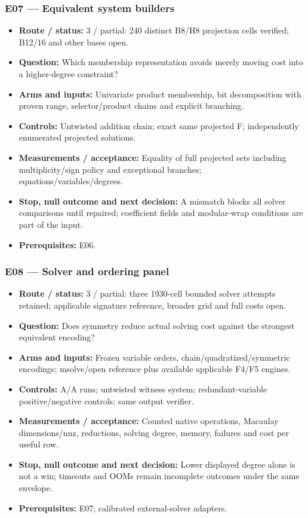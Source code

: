 \documentclass[
  10pt,
]{article}
\providecommand{\tightlist}{%
  \setlength{\itemsep}{0pt}\setlength{\parskip}{0pt}}
\begin{document}
\subsubsection{E07 --- Equivalent system
builders}\label{e07-equivalent-system-builders}

\begin{itemize}
\tightlist
\item
  \textbf{Route / status:} 3 / partial: 240 distinct B8/H8 projection
  cells verified; B12/16 and other bases open.
\item
  \textbf{Question:} Which membership representation avoids merely
  moving cost into a higher-degree constraint?
\item
  \textbf{Arms and inputs:} Univariate product membership, bit
  decomposition with proven range, selector/product chains and explicit
  branching.
\item
  \textbf{Controls:} Untwisted addition chain; exact same projected F;
  independently enumerated projected solutions.
\item
  \textbf{Measurements / acceptance:} Equality of full projected sets
  including multiplicity/sign policy and exceptional branches;
  equations/variables/degrees.
\item
  \textbf{Stop, null outcome and next decision:} A mismatch blocks all
  solver comparisons until repaired; coefficient fields and modular-wrap
  conditions are part of the input.
\item
  \textbf{Prerequisites:} E06.
\end{itemize}

\subsubsection{E08 --- Solver and ordering
panel}\label{e08-solver-and-ordering-panel}

\begin{itemize}
\tightlist
\item
  \textbf{Route / status:} 3 / partial: three 1930-cell bounded solver
  attempts retained; applicable signature reference, broader grid and
  full costs open.
\item
  \textbf{Question:} Does symmetry reduce actual solving cost against
  the strongest equivalent encoding?
\item
  \textbf{Arms and inputs:} Frozen variable orders,
  chain/quadratized/symmetric encodings; msolve/open reference plus
  available applicable F4/F5 engines.
\item
  \textbf{Controls:} A/A runs; untwisted witness system;
  redundant-variable positive/negative controls; same output verifier.
\item
  \textbf{Measurements / acceptance:} Counted native operations,
  Macaulay dimensions/nnz, reductions, solving degree, memory, failures
  and cost per useful row.
\item
  \textbf{Stop, null outcome and next decision:} Lower displayed degree
  alone is not a win; timeouts and OOMs remain incomplete outcomes under
  the same envelope.
\item
  \textbf{Prerequisites:} E07; calibrated external-solver adapters.
\end{itemize}
\end{document}
